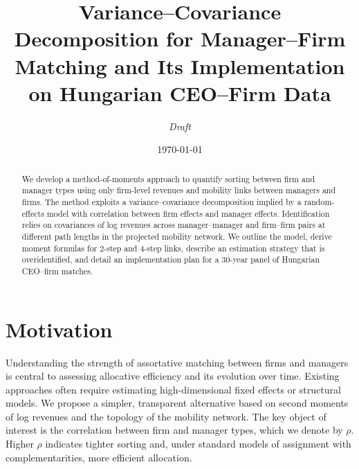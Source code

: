 \documentclass[11pt]{article}
\title{Variance--Covariance Decomposition for Manager--Firm Matching and Its Implementation on Hungarian CEO--Firm Data}
\author{\textit{Draft}}
\date{\today}
\begin{document}
\maketitle

\begin{abstract}
We develop a method-of-moments approach to quantify sorting between firm and manager types using only firm-level revenues and mobility links between managers and firms. The method exploits a variance--covariance decomposition implied by a random-effects model with correlation between firm effects and manager effects. Identification relies on covariances of log revenues across manager--manager and firm--firm pairs at different path lengths in the projected mobility network. We outline the model, derive moment formulas for 2-step and 4-step links, describe an estimation strategy that is overidentified, and detail an implementation plan for a 30-year panel of Hungarian CEO--firm matches.
\end{abstract}

\section{Motivation}
Understanding the strength of assortative matching between firms and managers is central to assessing allocative efficiency and its evolution over time. Existing approaches often require estimating high-dimensional fixed effects or structural models. We propose a simpler, transparent alternative based on second moments of log revenues and the topology of the mobility network. The key object of interest is the correlation between firm and manager types, which we denote by $\rho$. Higher $\rho$ indicates tighter sorting and, under standard models of assignment with complementarities, more efficient allocation.
\end{document}
